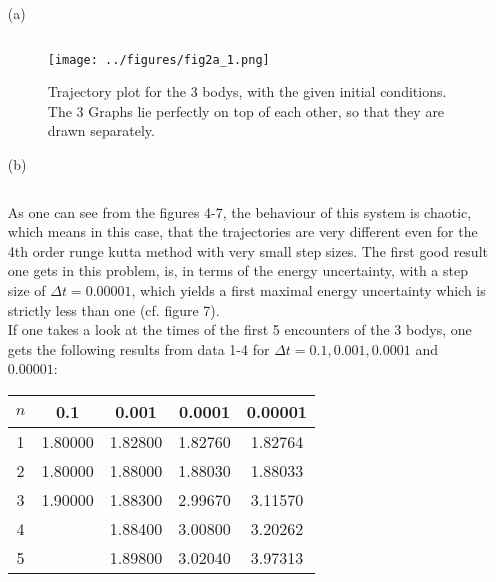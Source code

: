 \documentclass[12pt,a4paper]{article}
\newenvironment{code}{\captionsetup{type=listing}}{}
\begin{document}
\begin{enumerate}
	\item[(a)]
		\begin{code}
			\inputminted{python}{../problem2a.py}
		\end{code}

		\begin{figure}[h]
			\texttt{[image: ../figures/fig2a\_1.png]}
			\caption{Trajectory plot for the 3 bodys, with the given initial conditions. The 3 Graphs lie perfectly on top of each other, so that they are drawn separately.}
		\end{figure}

	\item[(b)]
		\begin{code}
			\inputminted{python}{../problem2b.py}
		\end{code}
		
		As one can see from the figures 4-7, the behaviour of this system is chaotic, which means in this case, that the trajectories are very different even for the 4th order runge kutta method with very small step sizes. The first \glqq good\grqq{} result one gets in this problem, is, in terms of the energy uncertainty, with a step size of $\Delta t = 0.00001$, which yields a first maximal energy uncertainty which is strictly less than one (cf. figure 7).\\
		If one takes a look at the times of the first 5 encounters of the 3 bodys, one gets the following results from data 1-4 for $\Delta t = 0.1, 0.001, 0.0001$ and $0.00001$:
		
		\begin{center}
			\begin{tabular}{ c | c | c | c | c }
				$n$ & 0.1 & 0.001 & 0.0001 & 0.00001 \\
				\hline
				1 & 1.80000 & 1.82800 & 1.82760 & 1.82764 \\
				2 & 1.80000 & 1.88000 & 1.88030 & 1.88033 \\
				3 & 1.90000 & 1.88300 & 2.99670 & 3.11570 \\
				4 &         & 1.88400 & 3.00800 & 3.20262 \\
				5 &         & 1.89800 & 3.02040 & 3.97313 \\
			\end{tabular}
		\end{center}
		

\end{enumerate}
\end{document}
